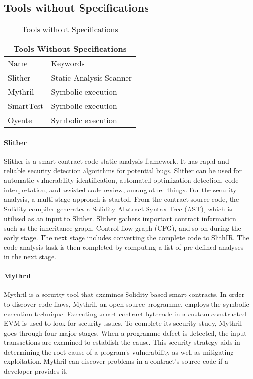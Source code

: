 \documentclass[a4paper,sigconf, language=french,
language=german, language=spanish, language=english]{acmart}
\begin{document}
\subsection{Tools without Specifications} 
\begin{table*}
  \caption{Tools without Specifications}
  \label{tab:ToolsWithoutSpec}
  \begin{tabular}{ |p{5cm}|p{5cm}|  }
  \hline
  \multicolumn{2}{|c|}{Tools Without Specifications } \\
  \hline
  Name & Keywords\\
  \hline
  Slither & Static Analysis Scanner\\
  \hline
  Mythril & Symbolic execution \\
  \hline
  SmartTest & Symbolic execution\\
  \hline
  Oyente  & Symbolic execution \\
  \hline
 \end{tabular}
\end{table*}
 

\paragraph{Slither} Slither is a smart contract code static analysis framework.
It has rapid and reliable security detection algorithms for potential bugs.
Slither can be used for automatic vulnerability identification, automated optimization detection, code interpretation, and assisted code review, among other things.
For the security analysis, a multi-stage approach is started.
From the contract source code, the Solidity compiler generates a Solidity Abstract Syntax Tree (AST), which is utilised as an input to Slither.
Slither gathers important contract information such as the inheritance graph, Control-flow graph (CFG), and so on during the early stage.
The next stage includes converting the complete code to SlithIR.
The code analysis task is then completed by computing a list of pre-defined analyses in the next stage. 

\paragraph{Mythril} Mythril is a security tool that examines Solidity-based smart contracts.
In order to discover code flaws, Mythril, an open-source programme, employs the symbolic execution technique.
Executing smart contract bytecode in a custom constructed EVM is used to look for security issues.
To complete its security study, Mythril goes through four major stages.
When a programme defect is detected, the input transactions are examined to establish the cause.
This security strategy aids in determining the root cause of a program's vulnerability as well as mitigating exploitation.
Mythril can discover problems in a contract's source code if a developer provides it. 
\end{document}
